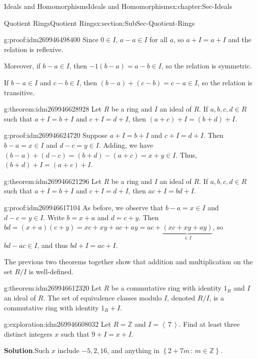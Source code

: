 \documentclass[oneside,10pt,]{book}
\numberwithin{equation}{section}
\newcommand{\ideal}[1]{\left\langle\, #1 \,\right\rangle}
\newcommand{\setof}[2]{{\left\{#1\,\colon\,#2\right\}}}
\def\Z{{\mathbb Z}}
\begin{document}
\begin{chapterptx}{Ideals and Homomorphisms}{}{Ideals and Homomorphisms}{}{}{x:chapter:Sec-Ideals}
\begin{sectionptx}{Quotient Rings}{}{Quotient Rings}{}{}{x:section:SubSec-Quotient-Rings}
\begin{proofptx}{}{g:proof:idm269946498400}
Since \(0\in I\), \(a-a \in I\) for all \(a\), so \(a + I = a+I\) and the relation is reflexive.%
\par
Moreover, if \(b-a \in I\), then \(-1(b-a) = a-b \in I\), so the relation is symmetric.%
\par
If \(b-a \in I\) and \(c-b\in I\), then \((b-a) + (c-b) = c-a \in I\), so the relation is transitive.%
\end{proofptx}
\begin{theorem}{}{}{g:theorem:idm269946628928}%
Let \(R\) be a ring and \(I\) an ideal of \(R\). If \(a,b,c,d\in R\) such that \(a+I = b+I\) and \(c+I = d+I\), then \((a+c) + I = (b+d) + I\).%
\end{theorem}
\begin{proofptx}{}{g:proof:idm269946624720}
Suppose \(a+I = b+I\) and \(c+I = d+I\). Then \(b-a =x \in I\) and \(d-c = y \in I\). Adding, we have \((b-a) + (d-c) = (b+d) - (a+c) = x+y \in I\). Thus, \((b+d) + I = (a+c) + I\).%
\end{proofptx}
\begin{theorem}{}{}{g:theorem:idm269946621296}%
Let \(R\) be a ring and \(I\) an ideal of \(R\). If \(a,b,c,d\in R\) such that \(a+I = b+I\) and \(c+I = d+I\), then \(ac + I = bd + I\).%
\end{theorem}
\begin{proofptx}{}{g:proof:idm269946617104}
As before, we observe that \(b-a = x\in I\) and \(d-c = y\in I\). Write \(b = x+a\) and \(d = c+y\). Then \(bd = (x+a)(c+y) = xc + xy + ac + ay = ac + \underbrace{(xc+xy+ay)}_{\in I}\), so \(bd - ac \in I\), and thus \(bd + I = ac + I\).%
\end{proofptx}
The previous two theorems together show that addition and multiplication on the set \(R/I\) is well-defined.%
\begin{theorem}{}{}{g:theorem:idm269946612320}%
Let \(R\) be a commutative ring with identity \(1_R\) and \(I\) an ideal of \(R\). The set of equivalence classes modulo \(I\), denoted \(R/I\), is a commutative ring with identity \(1_R + I\).%
\end{theorem}
\begin{exploration}{}{g:exploration:idm269946608032}%
Let \(R = \Z\) and \(I = \ideal{7}\). Find at least three distinct integers \(x\) such that \(9 + I = x + I\).%
\par\smallskip%
\noindent\textbf{Solution}.\hypertarget{g:solution:idm269946605216}{}\quad{}Such \(x\) include \(-5, 2, 16\), and anything in \(\setof{2+7m}{m\in\Z}\).%

\end{exploration}
\end{sectionptx}
\end{chapterptx}
\end{document}
